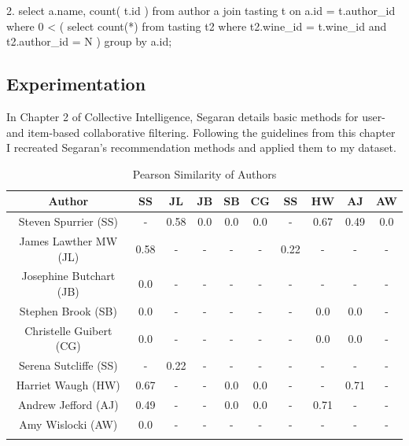 2. select a.name, count( t.id ) from author a join tasting t on a.id = t.author\_id where 0 < ( select count(*) from tasting t2 where t2.wine\_id = t.wine\_id and t2.author\_id = {N} ) group by a.id; 

\subsection{Experimentation}

In Chapter 2 of Collective Intelligence\cite{Segaran02}, Segaran details basic methods for user- and item-based collaborative filtering. Following the guidelines from this chapter I recreated Segaran's recommendation methods and applied them to my dataset.

\begin{table}[ht]
    \caption{Pearson Similarity of Authors}
    \centering
    \begin{tabular}{c c c c c c c c c c}
        \\\hline\hline
        Author                   & SS   & JL   & JB  & SB  & CG  & SS  & HW   & AJ   & AW
        \\\hline
        Steven Spurrier (SS)     & -    & 0.58 & 0.0 & 0.0 & 0.0 & -    & 0.67 & 0.49 & 0.0 \\
        James Lawther MW (JL)    & 0.58 & -    & -   & -   & -   & 0.22 & -    & -    & -   \\
        Josephine Butchart (JB)  & 0.0  & -    & -   & -   & -   & -    & -    & -    & -   \\
        Stephen Brook (SB)       & 0.0  & -    & -   & -   & -   & -    & 0.0  & 0.0  & -   \\
        Christelle Guibert (CG)  & 0.0  & -    & -   & -   & -   & -    & 0.0  & 0.0  & -   \\
        Serena Sutcliffe (SS)    & -    & 0.22 & -   & -   & -   & -    & -    & -    & -   \\
        Harriet Waugh (HW)       & 0.67 & -    & -   & 0.0 & 0.0 & -    & -    & 0.71 & -   \\
        Andrew Jefford (AJ)      & 0.49 & -    & -   & 0.0 & 0.0 & -    & 0.71 & -    & -   \\
        Amy Wislocki (AW)        & 0.0  & -    & -   & -   & -   & -    & -    & -    & -   \\
        \\\hline
    \end{tabular}
    \label{table:authormatrix}
\end{table}

